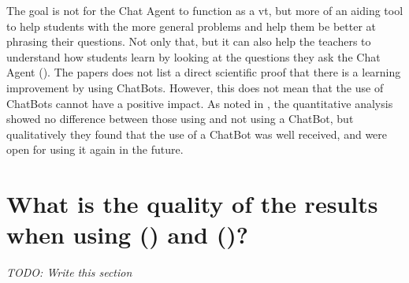 \vspace{0.5em}\newline
The goal is not for the Chat Agent to function as a \gls{vt}, but more of an aiding tool to help students with the more general problems and help them be better at phrasing 
their questions. Not only that, but it can also help the teachers to understand how students learn by looking at the questions they ask the Chat Agent (\citet{Knill2004,Rossi2011}). 
The papers does not list a direct scientific proof that there is a learning improvement by using ChatBots. However, this does not mean that the use of ChatBots cannot have a 
positive impact. As noted in \citet{Kowalski2013}, the quantitative analysis showed no difference between those using and not using a ChatBot, but qualitatively they found that 
the use of a ChatBot was well received, and were open for using it again in the future.


\section{What is the quality of the results when using  () and  ()?}
\label{chapter3:quality_results_hmm_bn}
\emph{TODO: Write this section}

